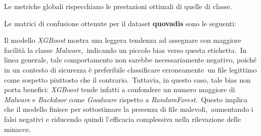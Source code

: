 \FloatBarrier

Le metriche globali rispecchiano le prestazioni ottimali di quelle di classe.


Le matrici di confusione ottenute per il dataset \textbf{quovadis} sono le seguenti:

\begin{figure}[t]
    \centering
    \caption{}
    \label{fig:octack-mtrx-rf}
\end{figure}

\FloatBarrier



Il modello \textit{XGBoost} mostra una leggera tendenza ad assegnare con maggiore facilità la classe \textit{Malware},\
indicando un piccolo bias verso questa etichetta.\
In linea generale, tale comportamento non sarebbe necessariamente negativo, poiché in un contesto di sicurezza è preferibile classificare erroneamente\
un file legittimo come sospetto piuttosto che il contrario.\
Tuttavia, in questo caso, tale bias non porta benefici: \textit{XGBoost} tende infatti a confondere un numero maggiore di \textit{Malware} e \textit{Backdoor} come \textit{Goodware} rispetto a \textit{RandomForest}.\
Questo implica che il modello finisce per sottostimare la presenza di file malevoli,\
aumentando i falsi negativi e riducendo quindi l'efficacia complessiva nella rilevazione delle minacce.

\begin{figure}[t]
    \centering
    \adjustbox{max width=1.4\linewidth, max height=1.2\textheight}{%
        
    }
    \caption{}
    \label{fig:octack-mtrx-rf}
\end{figure}

